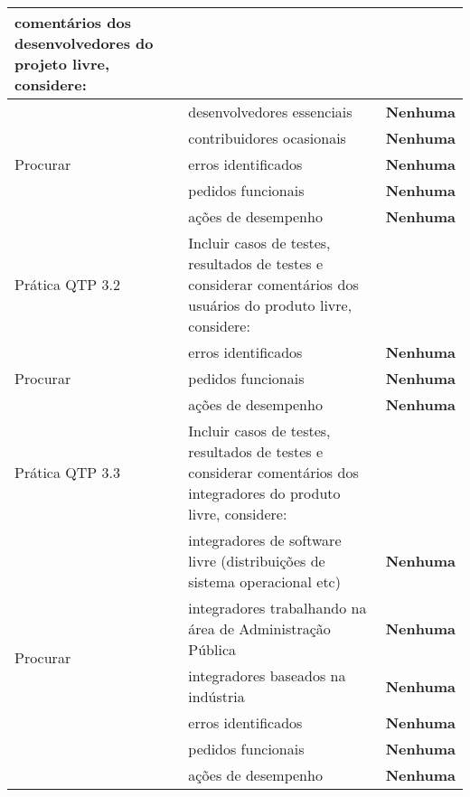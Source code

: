\begin{longtable}{|p{2cm}|p{7cm}|p{7cm}|}
  comentários dos desenvolvedores do projeto livre, considere: & \\
  \hline \multirow{5}{*}{Procurar} & desenvolvedores essenciais &
  \textbf{Nenhuma} \\
  \cline{2-3} & contribuidores ocasionais & \textbf{Nenhuma} \\
  \cline{2-3} & erros identificados & \textbf{Nenhuma} \\
  \cline{2-3} & pedidos funcionais & \textbf{Nenhuma} \\
  \cline{2-3} & ações de desempenho & \textbf{Nenhuma} \\
  \hline \cellcolor[gray]{0.9} Prática QTP 3.2 & \cellcolor[gray]{0.9}
  Incluir casos de testes, resultados de testes e considerar
  comentários dos usuários do produto livre, considere: & \\
  \hline \multirow{3}{*}{Procurar} & erros identificados &
  \textbf{Nenhuma} \\
  \cline{2-3} & pedidos funcionais & \textbf{Nenhuma} \\
  \cline{2-3} & ações de desempenho & \textbf{Nenhuma} \\
  \hline \cellcolor[gray]{0.9} Prática QTP 3.3 & \cellcolor[gray]{0.9}
  Incluir casos de testes, resultados de testes e considerar
  comentários dos integradores do produto livre, considere: & \\
  \hline \multirow{6}{*}{Procurar} & integradores de software livre
  (distribuições de sistema operacional etc) &
  \textbf{Nenhuma} \\
  \cline{2-3} & integradores trabalhando na área de Administração Pública & \textbf{Nenhuma} \\
  \cline{2-3} & integradores baseados na indústria & \textbf{Nenhuma}
  \\
  \cline{2-3} & erros identificados & \textbf{Nenhuma} \\
  \cline{2-3} & pedidos funcionais & \textbf{Nenhuma} \\
  \cline{2-3} & ações de desempenho & \textbf{Nenhuma} \\
  \hline
\end{longtable}

